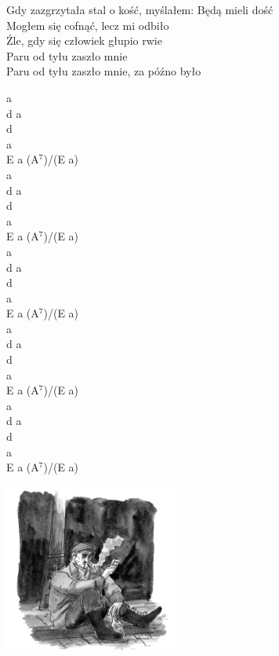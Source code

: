 \documentclass[a5paper, 10pt]{book}
\begin{document}
\begin{minipage}[t]{0.81\textwidth}
Gdy zazgrzytała stal o kość, myślałem: Będą mieli dość\\
Mogłem się cofnąć, lecz mi odbiło\\
\hspace*{5mm}Źle, gdy się człowiek głupio rwie\\
\hspace*{5mm}Paru od tyłu zaszło mnie\\
\hspace*{5mm}Paru od tyłu zaszło mnie, za późno było\\
\end{minipage}
\begin{minipage}[t]{0.19\textwidth}
  a\\
  d a\\
  d\\
  a\\
  E a (A$^7$)/(E a)\\
  
  a\\
  d a\\
  d\\
a\\
E a (A$^7$)/(E a)\\

a\\
d a\\
d\\
a\\
E a (A$^7$)/(E a)\\

a\\
d a\\
d\\
a\\
E a (A$^7$)/(E a)\\

a\\
d a\\
d\\
a\\
E a (A$^7$)/(E a)\\

\end{minipage}
\includegraphics[height=5.5cm,center]{images/bandyta.png}
\end{document}
